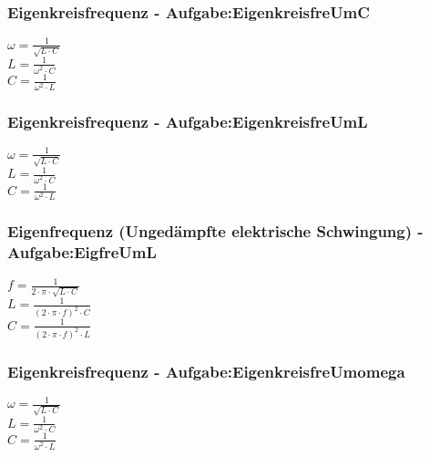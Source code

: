 \subsubsection{Eigenkreisfrequenz - Aufgabe:EigenkreisfreUmC} 
\begin{minipage}{0.45\textwidth} 
$ \omega  = \frac{ 1}{\sqrt{L\cdot C}} $\\ 
$ L= \frac{ 1}{\omega ^{2} \cdot C} $\\ 
$ C = \frac{ 1}{\omega ^{2} \cdot L} $\\ 
\end{minipage} 
\begin{minipage}{0.45\textwidth} 
 
\end{minipage} 
\subsubsection{Eigenkreisfrequenz - Aufgabe:EigenkreisfreUmL} 
\begin{minipage}{0.45\textwidth} 
$ \omega  = \frac{ 1}{\sqrt{L\cdot C}} $\\ 
$ L= \frac{ 1}{\omega ^{2} \cdot C} $\\ 
$ C = \frac{ 1}{\omega ^{2} \cdot L} $\\ 
\end{minipage} 
\begin{minipage}{0.45\textwidth} 
 
\end{minipage} 
\subsubsection{Eigenfrequenz (Ungedämpfte elektrische Schwingung) - Aufgabe:EigfreUmL} 
\begin{minipage}{0.45\textwidth} 
$ f = \frac{ 1}{2\cdot \pi \cdot \sqrt{L\cdot C}} $\\ 
$ L = \frac{ 1}{(2\cdot \pi \cdot f)^{2} \cdot C} $\\ 
$ C = \frac{ 1}{(2\cdot \pi \cdot f)^{2} \cdot L} $\\ 
\end{minipage} 
\begin{minipage}{0.45\textwidth} 
 
\end{minipage} 
\subsubsection{Eigenkreisfrequenz - Aufgabe:EigenkreisfreUmomega} 
\begin{minipage}{0.45\textwidth} 
$ \omega  = \frac{ 1}{\sqrt{L\cdot C}} $\\ 
$ L= \frac{ 1}{\omega ^{2} \cdot C} $\\ 
$ C = \frac{ 1}{\omega ^{2} \cdot L} $\\ 
\end{minipage} 
\begin{minipage}{0.45\textwidth} 
 
\end{minipage} 
